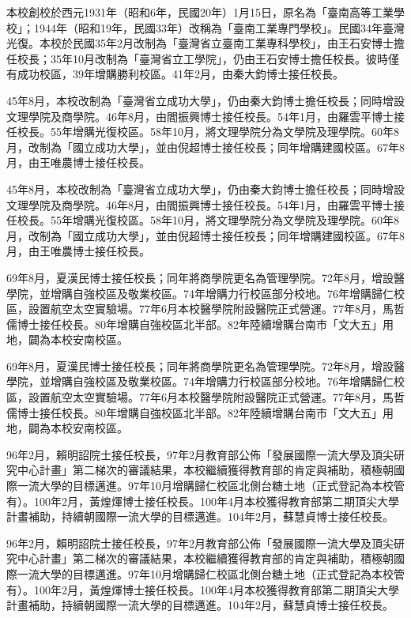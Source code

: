 
本校創校於西元1931年（昭和6年，民國20年）1月15日，原名為「臺南高等工業學校」；1944年（昭和19年，民國33年）改稱為「臺南工業專門學校」。民國34年臺灣光復。本校於民國35年2月改制為「臺灣省立臺南工業專科學校」，由王石安博士擔任校長；35年10月改制為「臺灣省立工學院」，仍由王石安博士擔任校長。彼時僅有成功校區，39年增購勝利校區。41年2月，由秦大鈞博士接任校長。

45年8月，本校改制為「臺灣省立成功大學」，仍由秦大鈞博士擔任校長；同時增設文理學院及商學院。46年8月，由閻振興博士接任校長。54年1月，由羅雲平博士接任校長。55年增購光復校區。58年10月，將文理學院分為文學院及理學院。60年8月，改制為「國立成功大學」，並由倪超博士接任校長；同年增購建國校區。67年8月，由王唯農博士接任校長。

45年8月，本校改制為「臺灣省立成功大學」，仍由秦大鈞博士擔任校長；同時增設文理學院及商學院。46年8月，由閻振興博士接任校長。54年1月，由羅雲平博士接任校長。55年增購光復校區。58年10月，將文理學院分為文學院及理學院。60年8月，改制為「國立成功大學」，並由倪超博士接任校長；同年增購建國校區。67年8月，由王唯農博士接任校長。

69年8月，夏漢民博士接任校長；同年將商學院更名為管理學院。72年8月，增設醫學院，並增購自強校區及敬業校區。74年增購力行校區部分校地。76年增購歸仁校區，設置航空太空實驗場。77年6月本校醫學院附設醫院正式營運。77年8月，馬哲儒博士接任校長。80年增購自強校區北半部。82年陸續增購台南市「文大五」用地，闢為本校安南校區。

69年8月，夏漢民博士接任校長；同年將商學院更名為管理學院。72年8月，增設醫學院，並增購自強校區及敬業校區。74年增購力行校區部分校地。76年增購歸仁校區，設置航空太空實驗場。77年6月本校醫學院附設醫院正式營運。77年8月，馬哲儒博士接任校長。80年增購自強校區北半部。82年陸續增購台南市「文大五」用地，闢為本校安南校區。

96年2月，賴明詔院士接任校長，97年2月教育部公佈「發展國際一流大學及頂尖研究中心計畫」第二梯次的審議結果，本校繼續獲得教育部的肯定與補助，積極朝國際一流大學的目標邁進。97年10月增購歸仁校區北側台糖土地（正式登記為本校管有）。100年2月，黃煌煇博士接任校長。100年4月本校獲得教育部第二期頂尖大學計畫補助，持續朝國際一流大學的目標邁進。104年2月，蘇慧貞博士接任校長。

96年2月，賴明詔院士接任校長，97年2月教育部公佈「發展國際一流大學及頂尖研究中心計畫」第二梯次的審議結果，本校繼續獲得教育部的肯定與補助，積極朝國際一流大學的目標邁進。97年10月增購歸仁校區北側台糖土地（正式登記為本校管有）。100年2月，黃煌煇博士接任校長。100年4月本校獲得教育部第二期頂尖大學計畫補助，持續朝國際一流大學的目標邁進。104年2月，蘇慧貞博士接任校長。

\EndChapter
